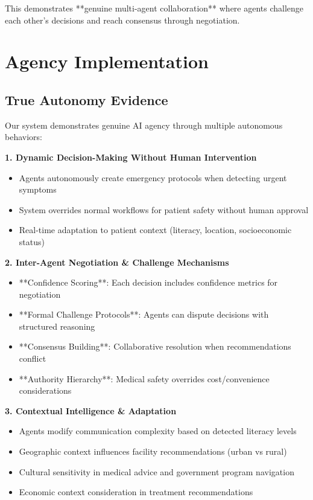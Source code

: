 \documentclass[11pt,a4paper]{article}
\begin{document}
This demonstrates **genuine multi-agent collaboration** where agents challenge each other's decisions and reach consensus through negotiation.

\section{Agency Implementation}

\subsection{True Autonomy Evidence}

Our system demonstrates genuine AI agency through multiple autonomous behaviors:

\textbf{1. Dynamic Decision-Making Without Human Intervention}
\begin{itemize}[leftmargin=*, itemsep=0pt]
    \item Agents autonomously create emergency protocols when detecting urgent symptoms
    \item System overrides normal workflows for patient safety without human approval
    \item Real-time adaptation to patient context (literacy, location, socioeconomic status)
\end{itemize}

\textbf{2. Inter-Agent Negotiation \& Challenge Mechanisms}
\begin{itemize}[leftmargin=*, itemsep=0pt]
    \item **Confidence Scoring**: Each decision includes confidence metrics for negotiation
    \item **Formal Challenge Protocols**: Agents can dispute decisions with structured reasoning
    \item **Consensus Building**: Collaborative resolution when recommendations conflict
    \item **Authority Hierarchy**: Medical safety overrides cost/convenience considerations
\end{itemize}

\textbf{3. Contextual Intelligence \& Adaptation}
\begin{itemize}[leftmargin=*, itemsep=0pt]
    \item Agents modify communication complexity based on detected literacy levels
    \item Geographic context influences facility recommendations (urban vs rural)
    \item Cultural sensitivity in medical advice and government program navigation
    \item Economic context consideration in treatment recommendations
\end{itemize}
\end{document}
